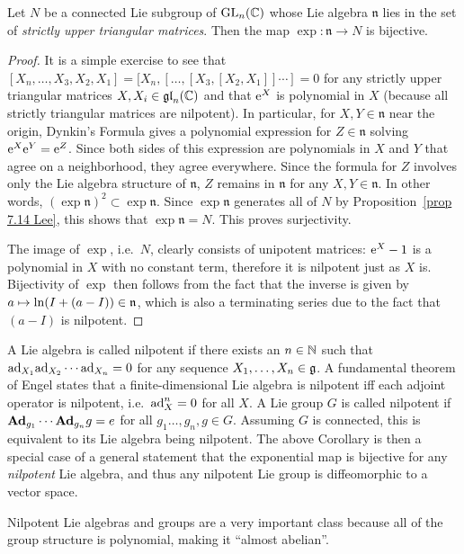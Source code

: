 \begin{cor}\label{cor 5.16 Sepanski}
    Let $N$ be a connected Lie subgroup of $\operatorname{GL}_n(\mathbb{C})$ whose Lie algebra $\mathfrak{n}$ lies in the set of \emph{strictly upper triangular matrices}. Then the map $\exp:\mathfrak{n}\to N$ is bijective. 
\end{cor}
\begin{proof}
    It is a simple exercise to see that $[X_n,\ldots,X_3,X_2,X_1]=[X_n,[\ldots,[X_3,[X_2,X_1]]\cdots ]=0$ for any strictly upper triangular matrices $X,X_i\in \mathfrak{gl}_n(\mathbb{C})$ and that $\mathrm{e}^X$ is polynomial in $X$ (because all strictly triangular matrices are nilpotent). In particular, for $X,Y\in\mathfrak{n}$ near the origin, Dynkin's Formula gives a polynomial expression for $Z\in\mathfrak{n}$ solving $\mathrm{e}^X\mathrm{e}^Y=\mathrm{e}^Z$. Since both sides of this expression are polynomials in $X$ and $Y$ that agree on a neighborhood, they agree everywhere. Since the formula for $Z$ involves only the Lie algebra structure of $\mathfrak{n}$, $Z$ remains in $\mathfrak{n}$ for any $X,Y\in\mathfrak{n}$. In other words, $(\exp\mathfrak{n})^2\subset \exp\mathfrak{n}$. Since $\exp\mathfrak{n}$ generates all of $N$ by Proposition~\ref{prop 7.14 Lee}, this shows that $\exp\mathfrak{n}=N$. This proves surjectivity.

    The image of $\exp$, i.e.~$N$, clearly consists of unipotent matrices: $\mathrm{e}^X-1$ is a polynomial in $X$ with no constant term, therefore it is nilpotent just as $X$ is. Bijectivity of $\exp$ then follows from the fact that the inverse is given by $a\mapsto \ln (I+(a-I))\in\mathfrak{n}$, which is also a terminating series due to the fact that $(a-I)$ is nilpotent.
\end{proof}

\begin{rem}
    A Lie algebra is called nilpotent if there exists an $n\in\mathbb{N}$ such that $\mathrm{ad}_{X_1}\mathrm{ad}_{X_2}\cdots \mathrm{ad}_{X_n}=0$ for any sequence $X_1,\ldots,X_n\in\mathfrak{g}$. A fundamental theorem of Engel states that a finite-dimensional Lie algebra is nilpotent iff each adjoint operator is nilpotent, i.e.~$\mathrm{ad}_X^n=0$ for all $X$. A Lie group $G$ is called nilpotent if $\mathrm{\mathbf{Ad}}_{g_1}\cdots \mathrm{\mathbf{Ad}}_{g_n}g=e$ for all $g_1\ldots,g_n,g\in G$. Assuming $G$  is connected, this is equivalent to its Lie algebra being nilpotent. The above Corollary is then a special case of a general statement that the exponential map is bijective for any \emph{nilpotent} Lie algebra, and thus any nilpotent Lie group is diffeomorphic to a vector space.

    Nilpotent Lie algebras and groups are a very important class because all of the group structure is polynomial, making it ``almost abelian''.
\end{rem}





